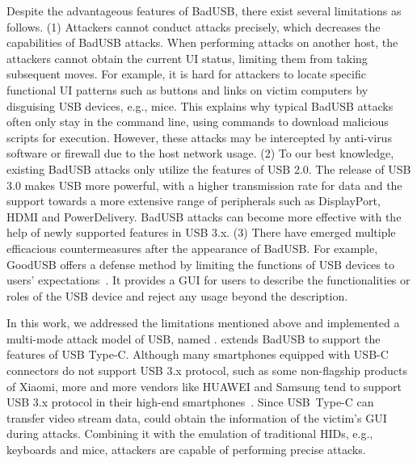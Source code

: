 Despite the advantageous features of BadUSB, there exist several limitations as
follows.  (1) Attackers cannot conduct attacks precisely, which decreases the
capabilities of BadUSB attacks.  When performing attacks on another host, the
attackers cannot obtain the current \ac{UI} status, limiting
them from taking subsequent moves.  For example, it is hard for attackers to
locate specific functional \ac{UI} patterns such as buttons and links on victim
computers by disguising \ac{USB} devices, e.g., mice.  This explains why typical
BadUSB attacks often only stay in the command line, using commands to download
malicious scripts for execution.  However, these attacks may be intercepted by
anti-virus software or firewall due to the host network usage.  (2) To
our best knowledge, existing BadUSB attacks only utilize the features of \ac{USB}
2.0.  The release of \ac{USB} 3.0 makes \ac{USB} more powerful, with a higher
transmission rate for data and the support towards a more extensive range of
peripherals such as DisplayPort, HDMI and PowerDelivery.  BadUSB attacks
can become more effective with the help of newly supported features in \ac{USB} 3.x.
(3) There have emerged multiple efficacious countermeasures after the
appearance of BadUSB.  For example, GoodUSB offers a defense method by limiting
the functions of \ac{USB} devices to users' expectations~\cite{tian2015defending}.
It provides a \ac{GUI} for users to describe the functionalities or
roles of the \ac{USB} device and reject any usage beyond the description.

In this work, we addressed the limitations mentioned
above and implemented a multi-mode attack model of \ac{USB}, named \tool.  \tool
extends BadUSB to support the features of \ac{USB} Type-C.
Although many smartphones equipped with USB-C connectors do not support \ac{USB} 3.x protocol, such as some non-flagship products of Xiaomi, more and more vendors like HUAWEI and Samsung tend to support \ac{USB} 3.x protocol in their \mbox{high-end} smartphones~\cite{usbclist}.
Since \mbox{\ac{USB} Type-C} can transfer video stream data, \tool could obtain the information of the
victim's \ac{GUI} during attacks.  Combining it with the emulation
of traditional \acp{HID}, e.g., keyboards and mice, attackers are capable of
performing precise attacks.

